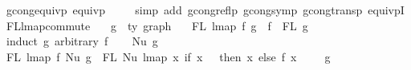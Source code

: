 \begin{isabellebody}
\isamarkupfalse%
\ gcong{\isacharunderscore}{\kern0pt}equivp{\isacharcolon}{\kern0pt}\ {\isachardoublequoteopen}equivp\ {\isacharparenleft}{\kern0pt}{\isasymsimeq}{\isacharparenright}{\kern0pt}{\isachardoublequoteclose}\isanewline
%
\isadelimproof
\ \ %
\endisadelimproof
%
\isatagproof
{}\isamarkupfalse%
\ {\isacharparenleft}{\kern0pt}simp\ add{\isacharcolon}{\kern0pt}\ gcong{\isacharunderscore}{\kern0pt}reflp\ gcong{\isacharunderscore}{\kern0pt}symp\ gcong{\isacharunderscore}{\kern0pt}transp\ equivpI{\isacharparenright}{\kern0pt}%
\endisatagproof
{\isafoldproof}%
%
\isadelimproof
%
\endisadelimproof
%
\isadelimdocument
%
\endisadelimdocument
%
\isatagdocument
%
\isamarkuptrue%
%
\isamarkuptrue%
%
\endisatagdocument
{\isafolddocument}%
%
\isadelimdocument
%
\endisadelimdocument
{}\isamarkupfalse%
\ FL{\isacharunderscore}{\kern0pt}lmap{\isacharunderscore}{\kern0pt}commute{\isacharcolon}{\kern0pt}\isanewline
\ \ \ g\ {\isacharcolon}{\kern0pt}{\isacharcolon}{\kern0pt}\ {\isachardoublequoteopen}{\isacharprime}{\kern0pt}ty\ graph{\isachardoublequoteclose}\isanewline
\ \ \ {\isachardoublequoteopen}FL\ {\isacharparenleft}{\kern0pt}lmap\ f\ g{\isacharparenright}{\kern0pt}\ {\isacharequal}{\kern0pt}\ f\ {\isacharbackquote}{\kern0pt}\ {\isacharparenleft}{\kern0pt}FL\ g{\isacharparenright}{\kern0pt}{\isachardoublequoteclose}\isanewline
%
\isadelimproof
%
\endisadelimproof
%
\isatagproof
{}\isamarkupfalse%
\ {\isacharparenleft}{\kern0pt}induct\ g\ arbitrary{\isacharcolon}{\kern0pt}\ f{\isacharparenright}{\kern0pt}\isanewline
\ \ \isamarkupfalse%
\ {\isacharparenleft}{\kern0pt}Nu\ g{\isacharparenright}{\kern0pt}\isanewline
\ \ \isamarkupfalse%
\ {\isachardoublequoteopen}FL\ {\isacharparenleft}{\kern0pt}lmap\ f\ {\isacharparenleft}{\kern0pt}Nu\ g{\isacharparenright}{\kern0pt}{\isacharparenright}{\kern0pt}\ {\isacharequal}{\kern0pt}\ FL\ {\isacharparenleft}{\kern0pt}Nu\ {\isacharparenleft}{\kern0pt}lmap\ {\isacharparenleft}{\kern0pt}{\isasymlambda}x{\isachardot}{\kern0pt}\ if\ x\ {\isacharequal}{\kern0pt}\ {}\ then\ x\ else\ {\isacharparenleft}{\kern0pt}f\ {\isacharparenleft}{\kern0pt}x\ {\isacharminus}{\kern0pt}\ {}{\isacharparenright}{\kern0pt}\ {\isacharplus}{\kern0pt}\ {}{\isacharparenright}{\kern0pt}{\isacharparenright}{\kern0pt}\ g{\isacharparenright}{\kern0pt}{\isacharparenright}{\kern0pt}{\isachardoublequoteclose}\isanewline

\end{isabellebody}
